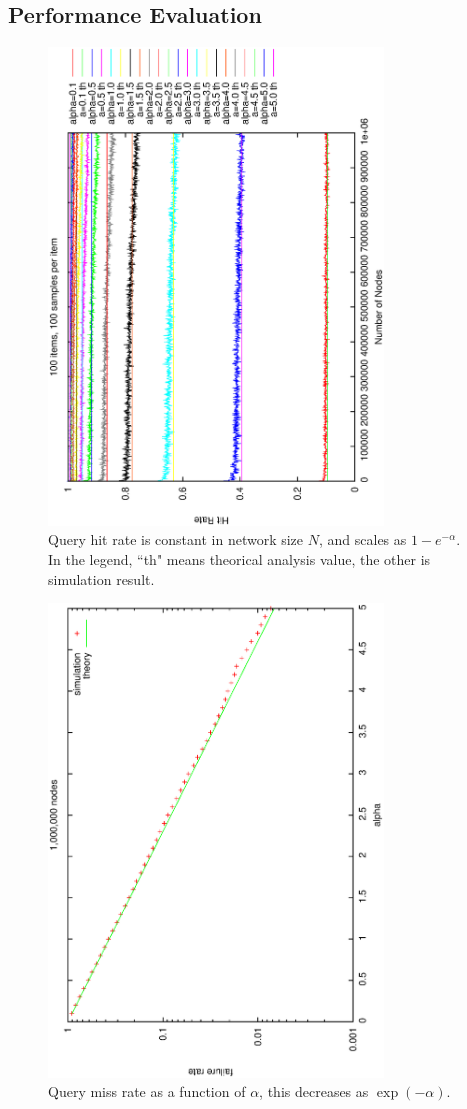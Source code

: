 \documentclass[9.5pt,journal,final,finalsubmission,twocolumn]{IEEEtran}
\begin{document}
\subsection{Performance Evaluation} 
\begin{figure}
\centering
\includegraphics[angle=270,width=3.5in]{th_hitrate}
\caption{Query hit rate is constant in network size $N$, and scales
as $1-e^{-\alpha}$. In the legend, ``th" means theorical analysis value, the other is simulation result.} \label{fig:hitrate}
\end{figure}
\begin{figure}[h]
\centering
\includegraphics[angle=270, width=3.5in]{mishit_logy}
\caption{Query miss rate as a function of $\alpha$, this decreases
as $\exp(-\alpha)$.} \label{fig:mishit}
\end{figure}
\end{document}

